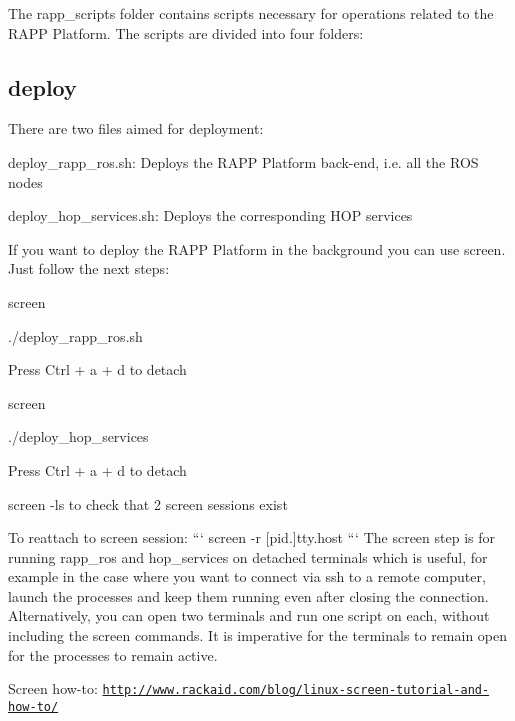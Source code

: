 The {\ttfamily rapp\-\_\-scripts} folder contains scripts necessary for operations related to the R\-A\-P\-P Platform. The scripts are divided into four folders\-:

\subsection*{deploy}

There are two files aimed for deployment\-:


\begin{DoxyItemize}
\item {\ttfamily deploy\-\_\-rapp\-\_\-ros.\-sh}\-: Deploys the R\-A\-P\-P Platform back-\/end, i.\-e. all the R\-O\-S nodes
\item {\ttfamily deploy\-\_\-hop\-\_\-services.\-sh}\-: Deploys the corresponding H\-O\-P services
\end{DoxyItemize}

If you want to deploy the R\-A\-P\-P Platform in the background you can use {\ttfamily screen}. Just follow the next steps\-:


\begin{DoxyItemize}
\item {\ttfamily screen}
\item {\ttfamily ./deploy\-\_\-rapp\-\_\-ros.sh}
\item Press Ctrl + a + d to detach
\item {\ttfamily screen}
\item {\ttfamily ./deploy\-\_\-hop\-\_\-services}
\item Press Ctrl + a + d to detach
\item {\ttfamily screen -\/ls} to check that 2 screen sessions exist
\end{DoxyItemize}

To reattach to screen session\-: ``` screen -\/r \mbox{[}pid.\mbox{]}tty.\-host ``` The screen step is for running rapp\-\_\-ros and hop\-\_\-services on detached terminals which is useful, for example in the case where you want to connect via ssh to a remote computer, launch the processes and keep them running even after closing the connection. Alternatively, you can open two terminals and run one script on each, without including the screen commands. It is imperative for the terminals to remain open for the processes to remain active.

Screen how-\/to\-: \href{http://www.rackaid.com/blog/linux-screen-tutorial-and-how-to/}{\tt http\-://www.\-rackaid.\-com/blog/linux-\/screen-\/tutorial-\/and-\/how-\/to/}

